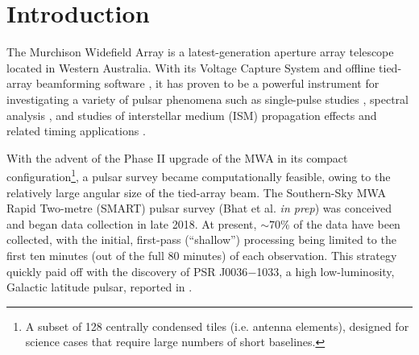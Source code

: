 \documentclass[linenumbers]{aastex631}
\newcommand{\psrnick}{J0036$-$1033}
\begin{document}


\section{Introduction} \label{sec:intro}

The Murchison Widefield Array \citep[MWA;][]{Tingay2013} is a latest-generation aperture array telescope located in Western Australia.
With its Voltage Capture System \citep[VCS;][]{Tremblay2015} and offline tied-array beamforming software \citep{Ord2019,McSweeney2020}, it has proven to be a powerful instrument for investigating a variety of pulsar phenomena such as single-pulse studies \citep{McSweeney2017}, spectral analysis \citep{Meyers2017}, and studies of interstellar medium (ISM) propagation effects and related timing applications \citep{Bhat2018,Kaur2019}.

With the advent of the Phase II upgrade of the MWA \citep{Wayth2018} in its compact configuration\footnote{A subset of 128 centrally condensed tiles (i.e. antenna elements), designed for science cases that require large numbers of short baselines.}, a pulsar survey became computationally feasible, owing to the relatively large angular size of the tied-array beam.
The Southern-Sky MWA Rapid Two-metre (SMART) pulsar survey (Bhat et al. \textit{in prep}) was conceived and began data collection in late 2018.
At present, $\sim70\%$ of the data have been collected, with the initial, first-pass (``shallow'') processing being limited to the first ten minutes (out of the full 80 minutes) of each observation.
This strategy quickly paid off with the discovery of PSR \psrnick{}, a high low-luminosity, Galactic latitude pulsar, reported in \citep{Swainston2021}.
\end{document}
